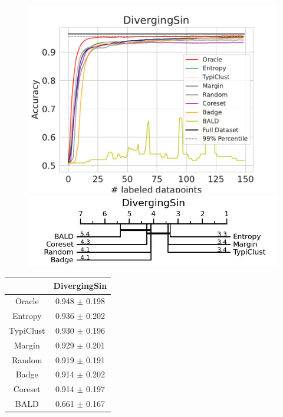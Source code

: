 \documentclass[]{article}
\begin{document}
\begin{minipage}{0.65\linewidth}
\begin{figure}[H]
    \centering
\includegraphics[width=\linewidth]{img/eval_divergingsin.pdf} \\[2mm]
\includegraphics[width=\linewidth]{img/micro_divsin.jpg}
\end{figure}
\end{minipage}
\begin{minipage}{0.29\linewidth}
\begin{tabular}{c|c}
&DivergingSin\\
\hline
Oracle&0.948 $\pm$ 0.198\\
Entropy&0.936 $\pm$ 0.202\\
TypiClust&0.930 $\pm$ 0.196\\
Margin&0.929 $\pm$ 0.201\\
Random&0.919 $\pm$ 0.191\\
Badge&0.914 $\pm$ 0.202\\
Coreset&0.914 $\pm$ 0.197\\
BALD&0.661 $\pm$ 0.167\\
\end{tabular}
\end{minipage}
\end{document}
